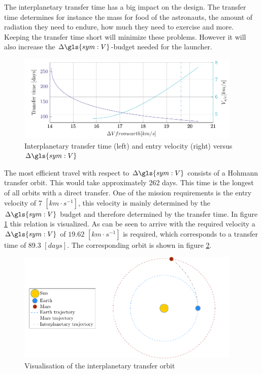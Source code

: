 The interplanetary transfer time has a big impact on the design. The transfer time determines for instance the mass for food of the astronauts, the amount of radiation they need to endure, how much they need to exercise and more. Keeping the transfer time short will minimize these problems. However it will also increase the $\Delta\gls{sym:V}$-budget needed for the launcher. 

\begin{figure}[ht]
	\centering
	\includegraphics[width=0.95\textwidth]{Figure/Inter_transfer/transfer_time.pdf}
	\caption[Interplanetary transfer time and entry velocity versus $\Delta\gls{sym:V}$]{Interplanetary transfer time (left) and entry velocity (right) versus $\Delta\gls{sym:V}$}
	\label{fig:inter_time}
\end{figure}

The most efficient travel with respect to $\Delta\gls{sym:V}$ consists of a Hohmann transfer orbit. This would take approximately 262 days. This time is the longest of all orbits with a direct transfer. One of the mission requirements is the entry velocity of 7 $\left[km \cdot s^{-1}\right]$, this velocity is mainly determined by the $\Delta \gls{sym:V}$ budget and therefore determined by the transfer time. In figure \ref{fig:inter_time} this relation is visualized. As can be seen to arrive with the required velocity a $\Delta \gls{sym:V}$ of $19.62$ $\left[km \cdot s^{-1}\right]$ is required, which corresponds to a transfer time of 89.3 $\left[days\right]$. The corresponding orbit is shown in figure \ref{fig:inter_orbit}.

\begin{figure}[ht]
	\centering
	\includegraphics[width=0.95\textwidth]{Figure/Inter_transfer/orbits.pdf}
	\caption{Visualisation of the interplanetary transfer orbit}
	\label{fig:inter_orbit}
\end{figure}
